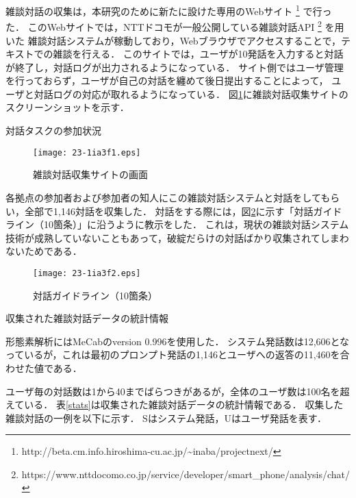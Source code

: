 \documentclass[japanese]{jnlp_1.4}
\renewcommand{\mod}[1]{}
\begin{document}
雑談対話の収集は，本研究のために新たに設けた専用のWebサイト
\footnote{http://beta.cm.info.hiroshima-cu.ac.jp/{\textasciitilde}inaba/projectnext/}
で行った．
このWebサイトでは，NTTドコモが一般公開している雑談対話API\cite{oonishi}
\footnote{https://www.nttdocomo.co.jp/service/developer/smart{\_}phone/analysis/chat/}
を用いた
雑談対話システムが稼動しており，Webブラウザでアクセスすることで，テキストでの雑談を行える．
このサイトでは，ユーザが10発話を入力すると対話が終了し，対話ログが出力されるようになっている．
サイト側ではユーザ管理を行っておらず，ユーザが自己の対話を纏めて後日提出することによって，
ユーザと対話ログの対応が取れるようになっている．
図\ref{screen}に雑談対話収集サイトのスクリーンショットを示す．

\begin{table}[b]
\caption{対話タスクの参加状況}
\label{members}

\end{table}
\begin{figure}[b]
\begin{center}
\texttt{[image: 23-1ia3f1.eps]}
\end{center}
\caption{雑談対話収集サイトの画面}
\label{screen}
\end{figure}

各拠点の参加者および参加者の知人にこの雑談対話システムと対話をしてもらい，全部で1,146対話を収集した．\mod{収集は2014年8月2日から31日の間に行った．}
対話をする際には，図\ref{10commandments}に示す「対話ガイドライン（10箇条）」に沿うように教示をした．
これは，現状の雑談対話システム技術が成熟していないこともあって，破綻だらけの対話ばかり収集されてしまわないためである．

\begin{figure}[t]
\begin{center}
\texttt{[image: 23-1ia3f2.eps]}
\end{center}
\caption{対話ガイドライン（10箇条）}
\label{10commandments}
\end{figure}
\begin{table}[t]
\caption{収集された雑談対話データの統計情報}
\label{stats}

\vspace{4pt}
\small
形態素解析にはMeCabのversion 0.996\mod{（辞書はipadic-2.7.0-20070801）}を使用した．
システム発話数は12,606となっているが，これは最初のプロンプト発話の1,146とユーザへの返答の11,460を合わせた値である．
\end{table}

ユーザ毎の対話数は1から40までばらつきがあるが，全体のユーザ数は100名を超えて\mbox{いる．}
表\ref{stats}は収集された雑談対話データの統計情報である．
収集した雑談対話の一例を以下に示す．
\linebreak
Sはシステム発話，Uはユーザ発話を表す．
\end{document}
